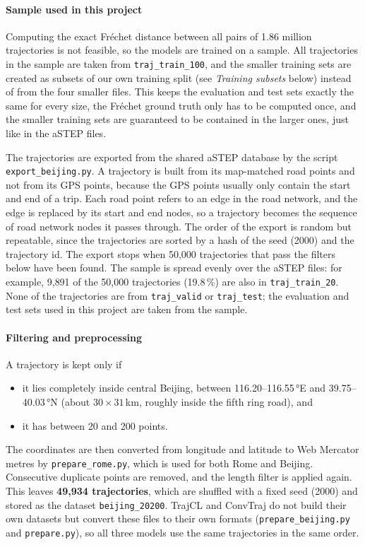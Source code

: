 \paragraph{Sample used in this project}
Computing the exact Fréchet distance between all pairs of 1.86 million trajectories
is not feasible, so the models are trained on a sample. All trajectories in the
sample are taken from \texttt{traj\_train\_100}, and the smaller training sets are
created as subsets of our own training split (see \emph{Training subsets} below)
instead of from the four smaller files. This keeps the evaluation and test sets
exactly the same for every size, the Fréchet ground truth only has to be computed
once, and the smaller training sets are guaranteed to be contained in the larger
ones, just like in the aSTEP files.

The trajectories are exported from the shared aSTEP database by the script
\texttt{export\_beijing.py}. A trajectory is built from its map-matched road points
and not from its GPS points, because the GPS points usually only contain the start
and end of a trip. Each road point refers to an edge in the road network, and the
edge is replaced by its start and end nodes, so a trajectory becomes the sequence
of road network nodes it passes through. The order of the export is random but
repeatable, since the trajectories are sorted by a hash of the seed (2000) and the
trajectory id. The export stops when 50{,}000 trajectories that pass the filters
below have been found. The sample is spread evenly over the aSTEP files: for
example, 9{,}891 of the 50{,}000 trajectories (19.8\,\%) are also in
\texttt{traj\_train\_20}. None of the trajectories are from \texttt{traj\_valid} or
\texttt{traj\_test}; the evaluation and test sets used in this project are taken
from the sample.

\paragraph{Filtering and preprocessing}
A trajectory is kept only if
\begin{itemize}
  \item it lies completely inside central Beijing, between 116.20--116.55\,°E and
        39.75--40.03\,°N (about $30 \times 31$\,km, roughly inside the fifth ring
        road), and
  \item it has between 20 and 200 points.
\end{itemize}
The coordinates are then converted from longitude and latitude to Web Mercator
metres by \texttt{prepare\_rome.py}, which is used for both Rome and Beijing.
Consecutive duplicate points are removed, and the length filter is applied again.
This leaves \textbf{49{,}934 trajectories}, which are shuffled with a fixed seed
(2000) and stored as the dataset \texttt{beijing\_20200}. TrajCL and ConvTraj do not
build their own datasets but convert these files to their own formats
(\texttt{prepare\_beijing.py} and \texttt{prepare.py}), so all three models use the
same trajectories in the same order.

